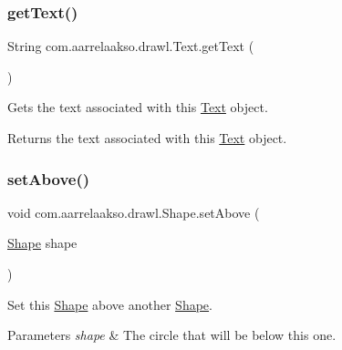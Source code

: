 \subsubsection{\texorpdfstring{get\+Text()}{getText()}}
{\footnotesize\ttfamily String com.\+aarrelaakso.\+drawl.\+Text.\+get\+Text (\begin{DoxyParamCaption}{ }\end{DoxyParamCaption})}

Gets the text associated with this \hyperlink{classcom_1_1aarrelaakso_1_1drawl_1_1_text}{Text} object.

\begin{DoxyReturn}{Returns}
the text associated with this \hyperlink{classcom_1_1aarrelaakso_1_1drawl_1_1_text}{Text} object. 
\end{DoxyReturn}
\mbox{\label{classcom_1_1aarrelaakso_1_1drawl_1_1_shape_a942b3cf3365498dc1ac6b0309ce33b86}} 
\subsubsection{\texorpdfstring{set\+Above()}{setAbove()}}
{\footnotesize\ttfamily void com.\+aarrelaakso.\+drawl.\+Shape.\+set\+Above (\begin{DoxyParamCaption}\item[{\hyperlink{classcom_1_1aarrelaakso_1_1drawl_1_1_shape}{Shape}}]{shape }\end{DoxyParamCaption})\hspace{0.3cm}{\ttfamily [inherited]}}

Set this \hyperlink{classcom_1_1aarrelaakso_1_1drawl_1_1_shape}{Shape} above another \hyperlink{classcom_1_1aarrelaakso_1_1drawl_1_1_shape}{Shape}.


\begin{DoxyParams}{Parameters}
{\em shape} & The circle that will be below this one. \\
\hline
\end{DoxyParams}
\mbox{\label{classcom_1_1aarrelaakso_1_1drawl_1_1_shape_aa0ec0030515b5096820e4dd030c0b320}} 
